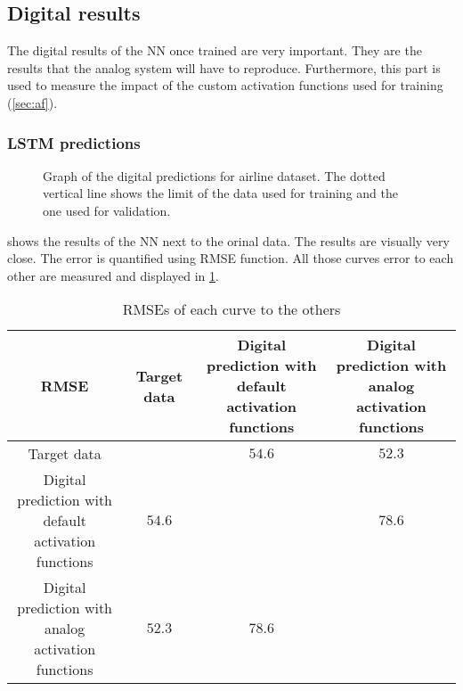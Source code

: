 \subsection{Digital results}
\label{subsec:digitalAirline}

The digital results of the \ac{NN} once trained are very important. They are the results that the analog system will have to reproduce. Furthermore, this part is used to measure the impact of the custom activation functions used for training (\cref{sec:af}).

\subsubsection{\acs{LSTM} predictions}

\begin{figure}[H]
  \centering
  
  \caption{Graph of the digital predictions for airline dataset. The dotted vertical line shows the limit of the data used for training and the one used for validation.}
  \label{graph:airlineDigital}
\end{figure}

 shows the results of the \ac{NN} next to the orinal data. The results are visually very close. The error is quantified using \ac{RMSE} function. All those curves error to each other are measured and displayed in \cref{tab:airlineDigital}.

\begin{table}[H]
  \centering
  \begin{tabular}{|c|c|c|c|}
    \hline
    \cellcolor[HTML]{808080}\acs{RMSE} & Target data & \specialcell{Digital prediction with\\default activation functions} & \specialcell{Digital prediction with\\analog activation functions}\\
    \hline
    Target data &\cellcolor[HTML]{202020} & $54.6$ & $52.3$\\
    \hline
    \specialcell{Digital prediction with\\default activation functions}  & $54.6$ & \cellcolor[HTML]{202020} & $78.6$\\
    \hline
    \specialcell{Digital prediction with\\analog activation functions} & $52.3$ & $78.6$ & \cellcolor[HTML]{202020}\\
    \hline
  \end{tabular}
  \caption{\acp{RMSE} of each curve to the others}
  \label{tab:airlineDigital}
\end{table}

